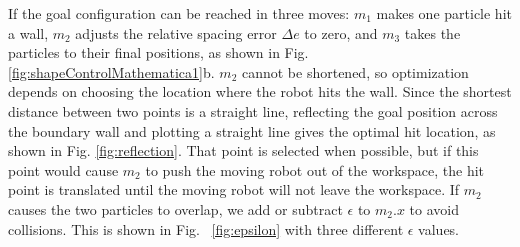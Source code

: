 If the goal configuration can be reached in three moves:  $m_1$  makes one particle hit a wall, $m_2$ adjusts the relative spacing error $\Delta e$ to zero, and  $m_3$ takes the particles to their final positions, as shown in Fig. \ref{fig:shapeControlMathematica1}b. 
$m_2$ cannot be shortened, so optimization depends on choosing the location where the robot hits the wall. 
 Since the shortest distance between two points is a straight line, reflecting the goal position across the boundary wall and plotting a straight line gives the optimal hit location, as shown in Fig. \ref{fig:reflection}.
That point is selected when possible, but if this point would cause $m_2$ to push the moving robot out of the workspace, the hit point is translated until the moving robot will not leave the workspace. If $m_2$ causes the two particles to overlap, we add or subtract $\epsilon$ to $m_2.x$ to avoid collisions. This is shown in Fig. ~\ref{fig:epsilon} with three different $\epsilon$ values.


